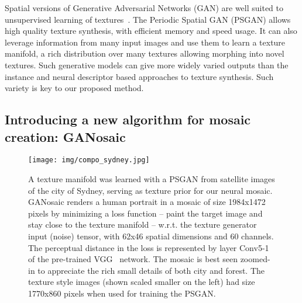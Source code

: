 \documentclass{article}
\begin{document}
Spatial versions of Generative Adversarial Networks (GAN) are well suited to unsupervised learning of textures~\cite{SGAN2016,PSGAN2017}. The Periodic Spatial GAN (PSGAN) allows high quality texture synthesis, with efficient memory and speed usage. It can also leverage information from many input images and use them to learn a texture manifold, a rich distribution over many textures allowing morphing into novel textures. Such generative models can give more widely varied outputs than the instance and neural descriptor based approaches to texture synthesis. Such variety is key to our proposed method.


\subsection{Introducing a new algorithm for mosaic creation: GANosaic}

\begin{figure}[t]
\centering
\texttt{[image: img/compo\_sydney.jpg]} 
\caption{A texture manifold was learned with a PSGAN from satellite images of the city of Sydney, serving as texture prior for our neural mosaic. 
GANosaic renders a human portrait in a mosaic of size 1984x1472 pixels by minimizing a loss function -- paint the target image and stay close to the texture manifold --  w.r.t. the texture generator input (noise) tensor, with 62x46 spatial dimensions and 60 channels. The perceptual distance in the loss is represented by layer Conv5-1 of the pre-trained VGG~\cite{Simonyan14c} network. The mosaic is best seen zoomed-in to appreciate the rich small details of both city  and forest. The texture style images (shown scaled smaller on the left) had size 1770x860 pixels when used for training the PSGAN.}
\label{fig_sat}
\end{figure}
\end{document}
